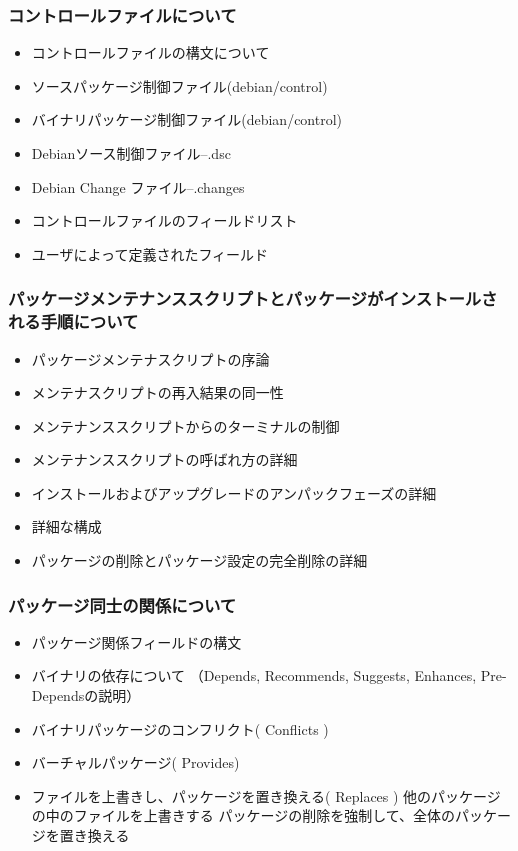 \documentclass[mingoth,a4paper]{jsarticle}
\begin{document}
    \subsubsection{コントロールファイルについて}
\begin{itemize}
        \item コントロールファイルの構文について
        \item ソースパッケージ制御ファイル(debian/control)
        \item バイナリパッケージ制御ファイル(debian/control)
        \item Debianソース制御ファイル--.dsc
        \item Debian Change ファイル--.changes
        \item コントロールファイルのフィールドリスト
        \item ユーザによって定義されたフィールド
\end{itemize}

    \subsubsection{パッケージメンテナンススクリプトとパッケージがインストールされる手順について}
\begin{itemize}
        \item パッケージメンテナスクリプトの序論
        \item メンテナスクリプトの再入結果の同一性
        \item メンテナンススクリプトからのターミナルの制御
        \item メンテナンススクリプトの呼ばれ方の詳細
        \item インストールおよびアップグレードのアンパックフェーズの詳細
        \item 詳細な構成
        \item パッケージの削除とパッケージ設定の完全削除の詳細
\end{itemize}

    \subsubsection{パッケージ同士の関係について}
\begin{itemize}
        \item パッケージ関係フィールドの構文
        \item バイナリの依存について
            （Depends, Recommends, Suggests, Enhances, Pre-Dependsの説明）
        \item バイナリパッケージのコンフリクト( Conflicts )
        \item バーチャルパッケージ( Provides)
        \item ファイルを上書きし、パッケージを置き換える( Replaces )
            他のパッケージの中のファイルを上書きする
            パッケージの削除を強制して、全体のパッケージを置き換える
\end{itemize}
\end{document}
